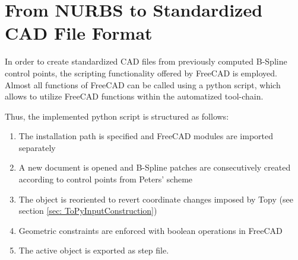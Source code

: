 \section{From NURBS to Standardized CAD File Format}
In order to create standardized CAD files from previously computed B-Spline control points, the scripting functionality offered by FreeCAD is employed. Almost all functions of FreeCAD can be called using a python script, which allows to utilize FreeCAD functions within the automatized tool-chain. \cite{FreeCAD}

Thus, the implemented python script is structured as follows: 
\begin{enumerate}
\item The installation path is specified and FreeCAD modules are imported separately
\item A new document is opened and B-Spline patches are consecutively created according to control points from Peters' scheme
\item  The object is reoriented to revert coordinate changes imposed by Topy (see section \ref{sec: ToPyInputConstruction})
\item Geometric constraints are enforced with boolean operations in FreeCAD  
\item The active object is exported as step file.
\end{enumerate} 




